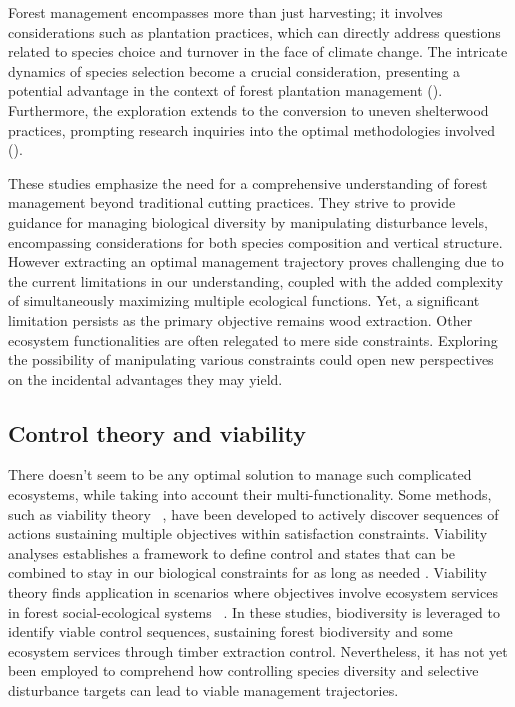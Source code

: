 \documentclass{article}
\begin{document}
Forest management encompasses more than just harvesting; it involves considerations such as plantation practices, which can directly address questions related to species choice and turnover in the face of climate change. The intricate dynamics of species selection become a crucial consideration, presenting a potential advantage in the context of forest plantation management (\autocite{brockerhoffPlantationForestsBiodiversity2008}). Furthermore, the exploration extends to the conversion to uneven shelterwood practices, prompting research inquiries into the optimal methodologies involved (\autocite{sinhaOptimalManagementNaturally2017,dudumanForestManagementPlanning2011,nylandEvenUnevenagedChallenges2003}).

These studies emphasize the need for a comprehensive understanding of forest management beyond traditional cutting practices. They strive to provide guidance for managing biological diversity by manipulating disturbance levels, encompassing considerations for both species composition and vertical structure. However extracting an optimal management trajectory proves challenging due to the current limitations in our understanding, coupled with the added complexity of simultaneously maximizing multiple ecological functions. Yet, a significant limitation persists as the primary objective remains wood extraction. Other ecosystem functionalities are often relegated to mere side constraints. Exploring the possibility of manipulating various constraints could open new perspectives on the incidental advantages they may yield.

\subsection{Control theory and viability}

There doesn't seem to be any optimal solution to manage such complicated ecosystems, while taking into account their multi-functionality. Some methods, such as viability theory ~\autocite{aubinStochasticViabilityInvariance1990}, have been developed to actively discover sequences of actions sustaining multiple objectives within satisfaction constraints. Viability analyses establishes a framework to define control and states that can be combined to stay in our biological constraints for as long as needed \autocite{rougeExtendingViabilityTheory2013}.
Viability theory finds application in scenarios where objectives involve ecosystem services in forest social-ecological systems ~\autocite{mathiasUsingViabilityTheory2015, Houballah2021, Houballah2023}. In these studies, biodiversity is leveraged to identify viable control sequences, sustaining forest biodiversity and some ecosystem services through timber extraction control.
Nevertheless, it has not yet been employed to comprehend how controlling species diversity and selective disturbance targets can lead to viable management trajectories.
\end{document}

